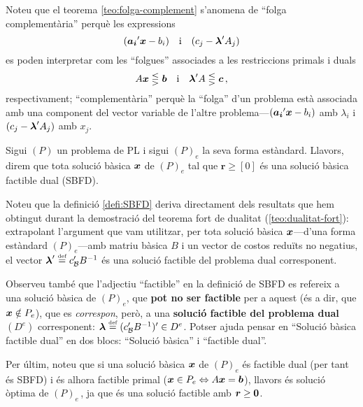 Noteu que el teorema \ref{teo:folga-complement} s'anomena de ``folga complementària'' perquè les expressions \[(\boldsymbol{a_i}'\boldsymbol{x}-b_i) \quad \text{i}\quad (c_j-\boldsymbol{\lambda}'A_j) \] es poden interpretar com les ``folgues'' associades a les restriccions primals i duals \[A\boldsymbol{x} \lesseqgtr \boldsymbol{b} \quad \text{i}\quad \boldsymbol{\lambda}'A \lesseqgtr \boldsymbol{c}\,,\] respectivament; ``complementària'' perquè la ``folga'' d'un problema està associada amb una component del vector variable de l'altre problema---$(\boldsymbol{a_i}'\boldsymbol{x}-b_i)$ amb $\lambda_i$ i $(c_j-\boldsymbol{\lambda}'A_j)$ amb $x_j$.

\begin{defi*}\label{defi:SBFD}
    Sigui $\left(P\right)$ un problema de PL i sigui $(P)_e$ la seva forma estàndard. Llavors, direm que tota solució bàsica $\boldsymbol{x}$ de $\left(P\right)_e$ tal que $\mathbf{r} \geq \left[0\right]$ és una solució bàsica factible dual (SBFD).
\end{defi*}

Noteu que la definició \ref{defi:SBFD} deriva directament dels resultats que hem obtingut durant la demostració del teorema fort de dualitat (\ref{teo:dualitat-fort}): extrapolant l'argument que vam utilitzar, per tota solució bàsica $\boldsymbol{x}$---d'una forma estàndard $(P)_e$---amb matriu bàsica $B$ i un vector de costos reduïts no negatius, el vector $\boldsymbol{\lambda}' \stackrel{\text{\tiny def}}{=} c_{\mathcal{B}}' B^{-1}$ és una solució factible del problema dual corresponent.

Observeu també que l'adjectiu ``factible'' en la definició de SBFD es refereix a una solució bàsica de $(P)_e$, que \textbf{pot no ser factible} per a aquest (és a dir, que $\boldsymbol{x}\notin P_e$), que es \textit{correspon}, però, a una \textbf{solució factible del problema dual} $(D^e)$ corresponent: $\boldsymbol{\lambda} \stackrel{\text{\tiny def}}{=} (c_{\mathcal{B}}' B^{-1})' \in D^e$. Potser ajuda pensar en ``Solució bàsica factible dual'' en dos blocs: ``Solució bàsica'' i ``factible dual''.

Per últim, noteu que si una solució bàsica $\boldsymbol{x}$ de $(P)_e$ és factible dual (per tant és SBFD) i és alhora factible primal ($\boldsymbol{x} \in P_e \Leftrightarrow A\boldsymbol{x} = \boldsymbol{b}$), llavors és solució òptima de $(P)_e\,$, ja que és una solució factible amb $\boldsymbol{r}\ge \boldsymbol{0}$.


